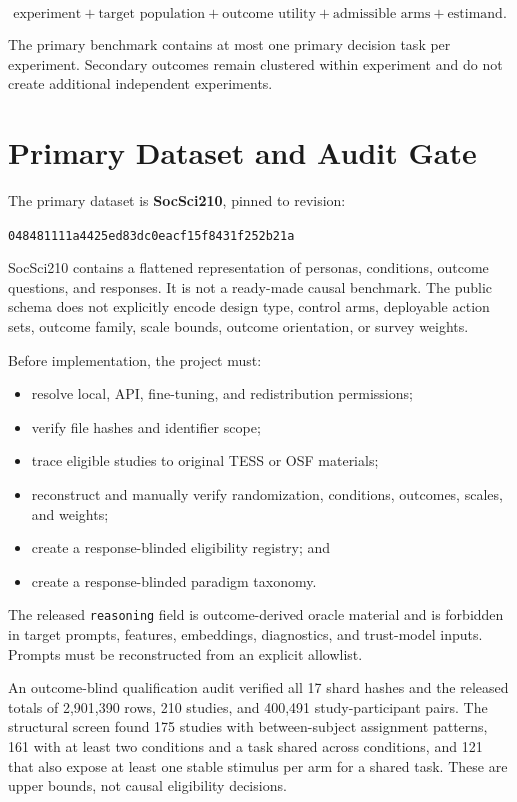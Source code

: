 \documentclass[11pt]{article}
\begin{document}
\[
\text{experiment} + \text{target population} + \text{outcome utility} + \text{admissible arms} + \text{estimand}.
\]

The primary benchmark contains at most one primary decision task per experiment. Secondary outcomes remain clustered within experiment and do not create additional independent experiments.

\section{Primary Dataset and Audit Gate}

The primary dataset is \textbf{SocSci210}, pinned to revision:

\begin{center}
\texttt{048481111a4425ed83dc0eacf15f8431f252b21a}
\end{center}

SocSci210 contains a flattened representation of personas, conditions, outcome questions, and responses. It is not a ready-made causal benchmark. The public schema does not explicitly encode design type, control arms, deployable action sets, outcome family, scale bounds, outcome orientation, or survey weights.

Before implementation, the project must:

\begin{itemize}
\item resolve local, API, fine-tuning, and redistribution permissions;
\item verify file hashes and identifier scope;
\item trace eligible studies to original TESS or OSF materials;
\item reconstruct and manually verify randomization, conditions, outcomes, scales, and weights;
\item create a response-blinded eligibility registry; and
\item create a response-blinded paradigm taxonomy.
\end{itemize}

The released \texttt{reasoning} field is outcome-derived oracle material and is forbidden in target prompts, features, embeddings, diagnostics, and trust-model inputs. Prompts must be reconstructed from an explicit allowlist.

An outcome-blind qualification audit verified all 17 shard hashes and the released totals of 2,901,390 rows, 210 studies, and 400,491 study-participant pairs. The structural screen found 175 studies with between-subject assignment patterns, 161 with at least two conditions and a task shared across conditions, and 121 that also expose at least one stable stimulus per arm for a shared task. These are upper bounds, not causal eligibility decisions.
\end{document}
